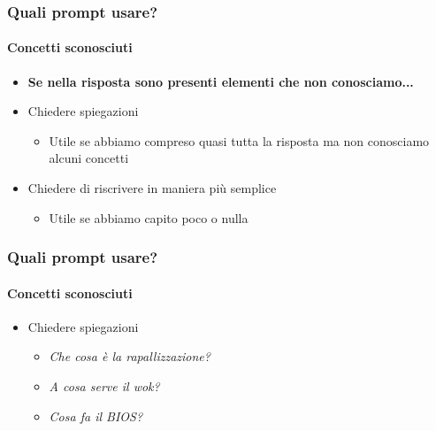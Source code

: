 \begin{contentframe}
    \frametitle{Quali prompt usare?}
    \framesubtitle{Concetti sconosciuti}
    
    \begin{itemize}
        \item \textbf{Se nella risposta sono presenti elementi che non conosciamo...}

        \bigskip
        \item Chiedere spiegazioni
        \begin{itemize}
            \item Utile se abbiamo compreso quasi tutta la risposta ma non conosciamo alcuni concetti
        \end{itemize}
        
        \item Chiedere di riscrivere in maniera più semplice
        \begin{itemize}
            \item Utile se abbiamo capito poco o nulla
        \end{itemize}
    \end{itemize}
\end{contentframe}

\begin{exampleframe}
    \frametitle{Quali prompt usare?}
    \framesubtitle{Concetti sconosciuti}

    \begin{itemize}
        \item Chiedere spiegazioni
        \begin{itemize}
            \item \textit{Che cosa è la rapallizzazione?}
            \item \textit{A cosa serve il wok?}
            \item \textit{Cosa fa il BIOS?}
        \end{itemize}
    \end{itemize}
\end{exampleframe}

